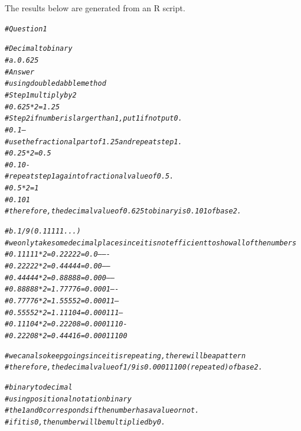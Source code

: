 \documentclass{article}\usepackage[]{graphicx}\usepackage[]{xcolor}
\makeatletter
\newcommand{\hlcom}[1]{\textcolor[rgb]{0.678,0.584,0.686}{\textit{#1}}}%
\newenvironment{kframe}{%
 \def\at@end@of@kframe{}%
 \ifinner\ifhmode%
  \def\at@end@of@kframe{\end{minipage}}%
  \begin{minipage}{\columnwidth}%
 \fi\fi%
 \def\FrameCommand##1{\hskip\@totalleftmargin \hskip-\fboxsep
 \colorbox{shadecolor}{##1}\hskip-\fboxsep
     \hskip-\linewidth \hskip-\@totalleftmargin \hskip\columnwidth}%
 \MakeFramed {\advance\hsize-\width
   \@totalleftmargin\z@ \linewidth\hsize
   \@setminipage}}%
 {\par\unskip\endMakeFramed%
 \at@end@of@kframe}
\newenvironment{knitrout}{}{} %
\makeatother
\begin{document}
The results below are generated from an R script.

\begin{knitrout}
\color{fgcolor}\begin{kframe}
\begin{alltt}
\hlcom{# Question 1}

\hlcom{# Decimal to binary}
\hlcom{# a. 0.625}
\hlcom{# Answer}
\hlcom{# using double dabble method}
\hlcom{# Step 1 multiply by 2 }
\hlcom{# 0.625*2 = 1.25}
\hlcom{# Step 2 if number is larger than 1, put 1 if not put 0.}
\hlcom{# 0.1--}
\hlcom{# use the fractional part of 1.25 and repeat step 1.}
\hlcom{# 0.25*2 = 0.5}
\hlcom{# 0.10-}
\hlcom{# repeat step 1 again to fractional value of 0.5.}
\hlcom{# 0.5*2 = 1}
\hlcom{# 0.101}
\hlcom{# therefore, the decimal value of 0.625 to binary is 0.101 of base 2.}

\hlcom{# b. 1/9 (0.11111...)}
\hlcom{# we only take some decimal place since it is not efficient to show all of the numbers}
\hlcom{# 0.11111*2 = 0.22222 = 0.0-------}
\hlcom{# 0.22222*2 = 0.44444 = 0.00------}
\hlcom{# 0.44444*2 = 0.88888 = 0.000-----}
\hlcom{# 0.88888*2 = 1.77776 = 0.0001----}
\hlcom{# 0.77776*2 = 1.55552 = 0.00011---}
\hlcom{# 0.55552*2 = 1.11104 = 0.000111--}
\hlcom{# 0.11104*2 = 0.22208 = 0.0001110-}
\hlcom{# 0.22208*2 = 0.44416 = 0.00011100}

\hlcom{# we can also keep going since it is repeating, there will be a pattern}
\hlcom{# therefore, the decimal value of 1/9 is 0.00011100 (repeated) of base 2.}

\hlcom{# binary to decimal}
\hlcom{# using positional notation binary}
\hlcom{# the 1 and 0 corresponds if the number has a value or not.}
\hlcom{# if it is 0, the number will be multiplied by 0.}


\end{alltt}
\end{kframe}
\end{knitrout}
\end{document}
